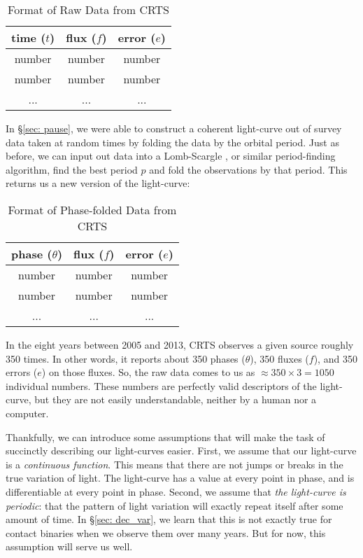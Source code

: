 \documentclass[12pt]{article} %
\numberwithin{equation}{section} %
\begin{document}
\begin{table}[htdp]
\caption{Format of Raw Data from CRTS}
\begin{center}
\begin{tabular}{|c|c|c|} \hline
\textbf{time} ($t$) & \textbf{flux} ($f$) & \textbf{error} ($e$) \\ \hline
number & number & number \\ \hline
number & number & number \\ \hline
... & ... & ... \\
\end{tabular}
\end{center}
\label{default}
\end{table}%

In \S\ref{sec: pause}, we were able to construct a coherent light-curve out of survey data taken at random times by folding the data by the orbital period. Just as before, we can input out data into a Lomb-Scargle , or similar period-finding algorithm, find the best period $p$ and fold the observations by that period. This returns us a new version of the light-curve:

\begin{table}[htdp]
\caption{Format of Phase-folded Data from CRTS}
\begin{center}
\begin{tabular}{|c|c|c|} \hline
\textbf{phase} ($\theta$) & \textbf{flux} ($f$) & \textbf{error} ($e$) \\ \hline
number & number & number \\ \hline
number & number & number \\ \hline
... & ... & ... \\
\end{tabular}
\end{center}
\label{default}
\end{table}%

In the eight years between 2005 and 2013, CRTS observes a given source roughly 350 times. In other words, it reports about 350 phases ($\theta$), 350 fluxes ($f$), and 350 errors ($e$) on those fluxes. So, the raw data comes to us as $\approx 350 \times 3 = 1050$ individual numbers. These numbers are perfectly valid descriptors of the light-curve, but they are not easily understandable, neither by a human nor a computer.

Thankfully, we can introduce some assumptions that will make the task of succinctly describing our light-curves easier. First, we assume that our light-curve is a \emph{continuous function}. This means that there are not jumps or breaks in the true variation of light. The light-curve has a value at every point in phase, and is differentiable at every point in phase. Second, we assume that \emph{the light-curve is periodic}: that the pattern of light variation will exactly repeat itself after some amount of time. In \S\ref{sec: dec_var}, we learn that this is not exactly true for contact binaries when we observe them over many years. But for now, this assumption will serve us well.
\end{document}
